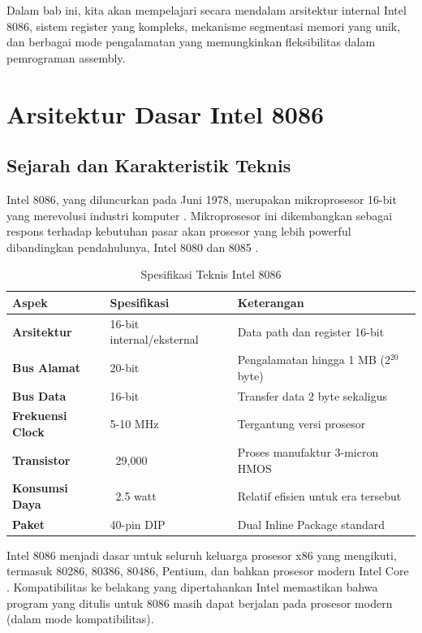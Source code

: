 \documentclass[../main.tex]{subfiles}
\begin{document}
    Dalam bab ini, kita akan mempelajari secara mendalam arsitektur internal Intel 8086, sistem register yang kompleks, mekanisme segmentasi memori yang unik, dan berbagai mode pengalamatan yang memungkinkan fleksibilitas dalam pemrograman assembly.

\section{Arsitektur Dasar Intel 8086}

    \subsection{Sejarah dan Karakteristik Teknis}
        Intel 8086, yang diluncurkan pada Juni 1978, merupakan mikroprosesor 16-bit yang merevolusi industri komputer \cite{intel_8086_user_manual}. Mikroprosesor ini dikembangkan sebagai respons terhadap kebutuhan pasar akan prosesor yang lebih powerful dibandingkan pendahulunya, Intel 8080 dan 8085 \cite{brey1986mikroprosesor}.

        \begin{table}[H]
            \centering
            \caption{Spesifikasi Teknis Intel 8086}
            \begin{tabular}{|p{2.5cm}|p{2.8cm}|p{6cm}|}
\hline
\textbf{Aspek} & \textbf{Spesifikasi} & \textbf{Keterangan} \\
\hline
\textbf{Arsitektur} & 16-bit internal/eksternal & Data path dan register 16-bit \\
\hline
\textbf{Bus Alamat} & 20-bit & Pengalamatan hingga 1 MB (2$^{20}$ byte) \\
\hline
\textbf{Bus Data} & 16-bit & Transfer data 2 byte sekaligus \\
\hline
\textbf{Frekuensi Clock} & 5-10 MHz & Tergantung versi prosesor \\
\hline
\textbf{Transistor} & ~29,000 & Proses manufaktur 3-micron HMOS \\
\hline
\textbf{Konsumsi Daya} & ~2.5 watt & Relatif efisien untuk era tersebut \\
\hline
\textbf{Paket} & 40-pin DIP & Dual Inline Package standard \\
\hline
            \end{tabular}
            \label{tab:8086-specifications}
        \end{table}

        Intel 8086 menjadi dasar untuk seluruh keluarga prosesor x86 yang mengikuti, termasuk 80286, 80386, 80486, Pentium, dan bahkan prosesor modern Intel Core \cite{intel2019manual32}. Kompatibilitas ke belakang yang dipertahankan Intel memastikan bahwa program yang ditulis untuk 8086 masih dapat berjalan pada prosesor modern (dalam mode kompatibilitas).
\end{document}
